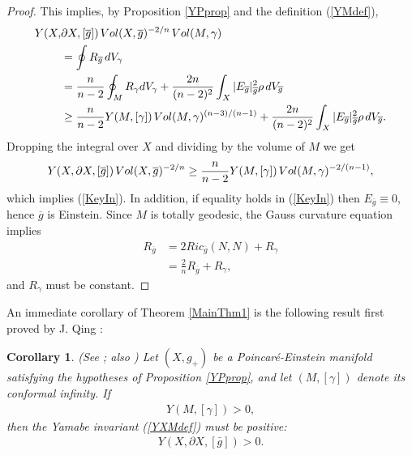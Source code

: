 \documentclass{amsart}
\newcommand{\hs}{\hskip.02in}
\newtheorem{corollary}[theorem]{Corollary}
\theoremstyle{definition}
\theoremstyle{remark}
\numberwithin{equation}{section}
\begin{document}
\begin{proof}
This implies, by Proposition \ref{YPprop} and the definition (\ref{YMdef}),
\begin{align} \label{s6}  \begin{split}
Y(X,&\partial X,[\overline{g}]) \hs  Vol(X,\overline{g})^{-2/n} \hs Vol(M,\gamma) \\
 &= \oint R_{\overline{g}} \hs dV_{\gamma}  \\
&= \frac{n}{n-2} \oint_M R_{\gamma} dV_{\gamma} + \frac{2n}{(n-2)^2}  \int_{X} | E_{\overline{g}}|^2_{\overline{g}} \rho\hs dV_{\overline{g}} \\
&\geq \frac{n}{n-2} Y(M,[\gamma]) \hs Vol(M,\gamma)^{(n-3)/(n-1)} + \frac{2n}{(n-2)^2}  \int_{X} | E_{\overline{g}}|^2_{\overline{g}} \rho\hs dV_{\overline{g}}.
\end{split}
\end{align}
Dropping the integral over $X$ and dividing by the volume of $M$ we get
\begin{align*}
Y(X,\partial X,[\overline{g}]) \hs Vol(X,\overline{g})^{-2/n}  \geq \frac{n}{n-2} Y(M,[\gamma]) \hs Vol(M,\gamma)^{-2/(n-1)},
\end{align*}
which implies (\ref{KeyIn}).  In addition, if equality holds in (\ref{KeyIn}) then $E_{\overline{g}} \equiv 0$, hence $\overline{g}$ is Einstein.  Since $M$ is totally geodesic, the Gauss curvature equation implies
\begin{align*}
R_{\overline{g}} &= 2 Ric_{\overline{g}}(N,N) + R_{\gamma} \\
&= \frac{2}{n} R_{\overline{g}} + R_{\gamma},
\end{align*}
and $R_{\gamma}$ must be constant.
\end{proof}


An immediate corollary of Theorem \ref{MainThm1} is the following result first proved by J. Qing \cite{JQ}:

\begin{corollary} (See \cite{JQ}; also \cite{CQY}) Let $(X,g_{+})$ be a Poincar\'e-Einstein manifold satisfying the hypotheses of Proposition \ref{YPprop}, and let $(M,[\gamma])$ denote its conformal infinity. If
\begin{align*} %
Y(M,[\gamma]) > 0,
\end{align*}
then the Yamabe invariant (\ref{YXMdef}) must be positive:
\begin{align*}
Y(X,\partial X, [\bar{g}]) > 0.
\end{align*}
\end{corollary}
\end{document}
